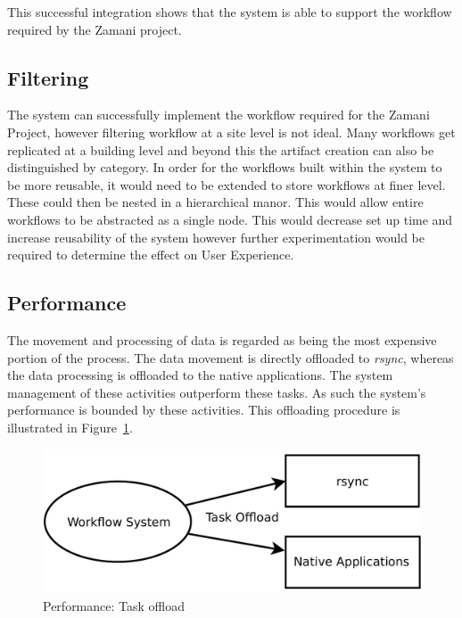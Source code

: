 \documentclass[12pt,a4paper]{report}
\begin{document}
\noindent This successful integration shows that the system is able to support the
workflow required by the Zamani project.


\subsection{Filtering}
The system can successfully implement the workflow required for the Zamani
Project, however filtering workflow at a site level is not ideal. Many workflows
get replicated at a building level and beyond this the artifact creation can
also be distinguished by category. In order for the workflows built within the
system to be more reusable, it would need to be extended to store workflows at
finer level. These could then be nested in a hierarchical manor. This would
allow entire workflows to be abstracted as a single node. This would decrease
set up time and increase reusability of the system however further
experimentation would be required to determine the effect on User Experience.

\subsection{Performance}
The movement and processing of data is regarded as being the most expensive
portion of the process. The data movement is directly offloaded to \emph{rsync},
whereas the data processing is offloaded to the native applications. The system
management of these activities outperform these tasks. As such the system's
performance is bounded by these activities. This offloading procedure is
illustrated in Figure~\ref{eval:offload}.

\begin{figure}[!h]
    \begin{center}
        \includegraphics[scale=0.45]{figures/offload.pdf}
    \end{center}
    \caption{Performance: Task offload}
    \label{eval:offload}
\end{figure}
\end{document}
